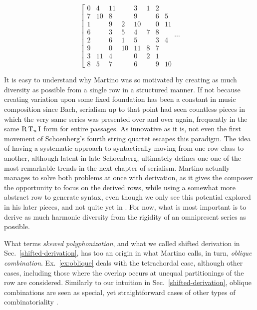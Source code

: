 \begin{example}
    \begin{equation}
    	\left[
    	\begin{array}{cc|cc|cc|cc|}
        	0 & 4 & 11 && 3 & 1 & 2 & \\
        	7 & 10 & 8 && 9 && 6 & 5 \\
        	1 && 9 & 2 & 10 && 0 & 11 \\
        	6 && 3 & 5 & 4 & 7 & 8 & \\
        	2 && 6 & 1 & 5 && 3 & 4 \\
        	9 && 0 & 10 & 11 & 8 & 7 & \\
        	3 & 11 & 4 && 0 & 2 & 1 & \\
        	8 & 5 & 7 && 6 && 9 & 10
    	\end{array}
    	\right. \cdots
	\end{equation}
\end{example}

It is easy to understand why Martino was so motivated by creating as much diversity as possible from a single row in a structured manner. If not because creating variation upon some fixed foundation has been a constant in music composition since Bach, serialism up to that point had seen countless pieces in which the very same series was presented over and over again, frequently in the same $\operatorname{R}\operatorname{T}_n\operatorname{I}$ form for entire passages. As innovative as it is, not even the first movement of Schoenberg's fourth string quartet escapes this paradigm. The idea of having a systematic approach to syntactically moving from one row class to another, although latent in late Schoenberg, ultimately defines one one of the most remarkable trends in the next chapter of serialism. Martino actually manages to solve both problems at once with derivation, as it gives the composer the opportunity to focus on the derived rows, while using a somewhat more abstract row to generate syntax, even though we only see this potential explored in his later pieces, and not quite yet in \cite{Martino1961}. For now, what is most important is to derive as much harmonic diversity from the rigidity of an omnipresent series as possible.

What \cite{Starr1984} terms \emph{skewed polyphonization}, and what we called shifted derivation in Sec.~\ref{shifted-derivation}, has too an origin in what Martino calls, in turn, \emph{oblique combination}. Ex.~\ref{ex:oblique} deals with the tetrachordal case, although other cases, including those where the overlap occurs at unequal partitionings of the row are considered. Similarly to our intuition in Sec.~\ref{shifted-derivation}, oblique combinations are seen as special, yet straightforward cases of other types of combinatoriality \cite[267]{Martino1961}.

